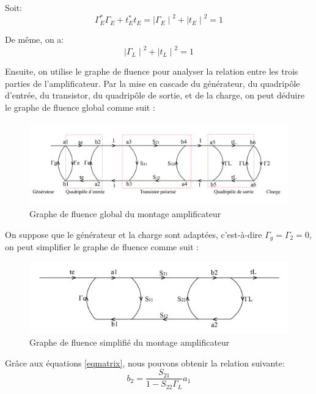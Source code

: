\documentclass[french]{article}
\begin{document}
Soit:
\begin{equation}
	\Gamma_{E}^{\ast}\Gamma_{E}+t_{E}^{\ast}t_{E}
	={\mid \Gamma_{E}\mid}^2+{\mid t_{E}\mid}^2
	=1
	\label{eq2}
\end{equation}

De même, on a:
\begin{equation}
	{\mid \Gamma_{L}\mid}^2+{\mid t_{L}\mid}^2
	=1
	\label{eq3}
\end{equation}

Ensuite, on utilise le graphe de fluence pour analyser la relation entre les trois parties de l'amplificateur. Par la mise en cascade du générateur, du quadripôle d’entrée, du transistor, du quadripôle de sortie, et de la charge, on peut déduire le graphe de fluence global comme suit :

\begin{figure}[H]
	\centering
	\includegraphics[width=0.9\linewidth]{../5SynthAmp/flux_global}
	\caption{Graphe de fluence global du montage amplificateur}
	\label{fig:flux_global}
\end{figure}

On suppose que le générateur et la charge sont adaptées, c’est-à-dire $\Gamma_{g}=\Gamma_{2}=0$, on peut simplifier le graphe de fluence comme suit :

\begin{figure}[H]
	\centering
	\includegraphics[width=0.9\linewidth]{../5SynthAmp/flux_simple}
	\caption{Graphe de fluence simplifié du montage amplificateur}
	\label{fig:flux_simple}
\end{figure}

Grâce aux équations \ref{eqmatrix}, nous pouvons obtenir la relation suivante:
\begin{equation}
	b_{2}=\frac{S_{21}}{1-S_{22}\Gamma_{L}}a_{1}
\end{equation}
\end{document}

